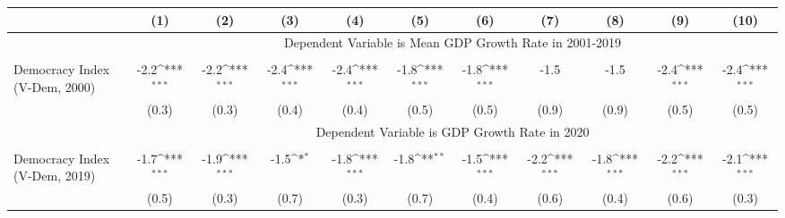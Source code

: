 {
\def\sym#1{\ifmmode^{#1}\else\(^{#1}\)\fi}
\begin{tabular}{l*{10}{c}}
\hline\hline
&\multicolumn{1}{c}{(1)}         &\multicolumn{1}{c}{(2)}         &\multicolumn{1}{c}{(3)}         &\multicolumn{1}{c}{(4)}         &\multicolumn{1}{c}{(5)}         &\multicolumn{1}{c}{(6)}         &\multicolumn{1}{c}{(7)}         &\multicolumn{1}{c}{(8)}         &\multicolumn{1}{c}{(9)}         &\multicolumn{1}{c}{(10)}         \\
\hline & \multicolumn{10}{c}{Dependent Variable is Mean GDP Growth Rate in 2001-2019} \\\cline{2-11}\\[-1.8ex]
Democracy Index (V-Dem, 2000)&        -2.2\sym{***}&        -2.2\sym{***}&        -2.4\sym{***}&        -2.4\sym{***}&        -1.8\sym{***}&        -1.8\sym{***}&        -1.5         &        -1.5         &        -2.4\sym{***}&        -2.4\sym{***}\\
&       (0.3)         &       (0.3)         &       (0.4)         &       (0.4)         &       (0.5)         &       (0.5)         &       (0.9)         &       (0.9)         &       (0.5)         &       (0.5)         \\

& \multicolumn{10}{c}{Dependent Variable is GDP Growth Rate in 2020} \\\cline{2-11}\\[-1.8ex]
Democracy Index (V-Dem, 2019)&        -1.7\sym{***}&        -1.9\sym{***}&        -1.5\sym{*}  &        -1.8\sym{***}&        -1.8\sym{**} &        -1.5\sym{***}&        -2.2\sym{***}&        -1.8\sym{***}&        -2.2\sym{***}&        -2.1\sym{***}\\
&       (0.5)         &       (0.3)         &       (0.7)         &       (0.3)         &       (0.7)         &       (0.4)         &       (0.6)         &       (0.4)         &       (0.6)         &       (0.3)         \\


\end{tabular}}
